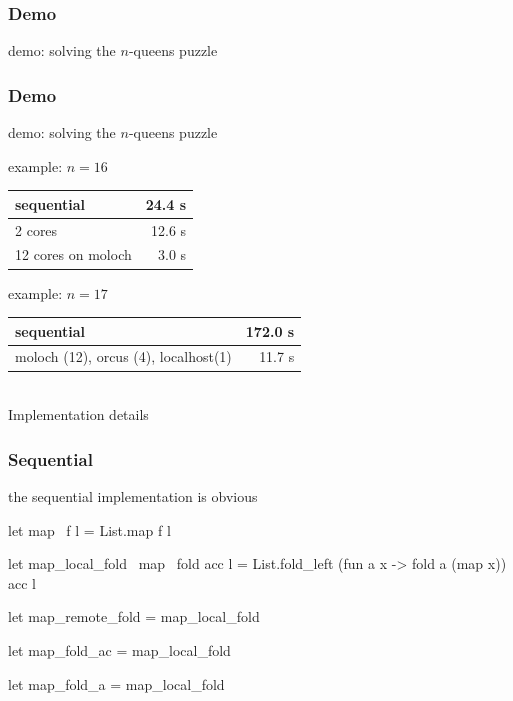 \documentclass{beamer}
\let\emph\alert
\begin{document}
\begin{frame}\frametitle{Demo}
  \emph{demo}: solving the $n$-queens puzzle
\end{frame}

\begin{frame}\frametitle{Demo}
  \emph{demo}: solving the $n$-queens puzzle



  example: $n=16$
  \begin{center}
    \begin{tabular}{|l|r|}
      \hline
      sequential & 24.4 s \\\hline
      2 cores    & 12.6 s \\\hline
      12 cores on moloch & 3.0 s \\\hline
    \end{tabular}
  \end{center}

  example: $n=17$
  \begin{center}
    \begin{tabular}{|l|r|}
       \hline
      sequential & 172.0 s \\\hline
      moloch (12), orcus (4), localhost(1) & 11.7 s \\\hline
    \end{tabular}
  \end{center}
\end{frame}

\begin{frame}
  \begin{center}
    \hrulefill\\
    \emph{Implementation details}
  \end{center}
\end{frame}

\begin{frame}\frametitle{Sequential}
the sequential implementation is obvious

  \begin{ocaml}
let map ~f l = List.map f l

let map_local_fold ~map ~fold acc l =
  List.fold_left (fun a x -> fold a (map x)) acc l

let map_remote_fold = map_local_fold

let map_fold_ac = map_local_fold

let map_fold_a = map_local_fold
  \end{ocaml}
\end{frame}
\end{document}
